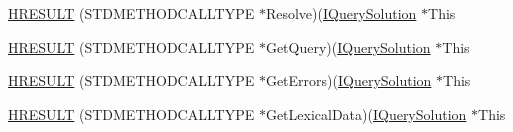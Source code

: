 \begin{DoxyCompactItemize}
\item 
\hyperlink{struct_i_query_solution_vtbl_a285c6d05bfc27f9d668abb84b76f8488}{H\+R\+E\+S\+U\+LT} (S\+T\+D\+M\+E\+T\+H\+O\+D\+C\+A\+L\+L\+T\+Y\+PE $\ast$Resolve)(\hyperlink{structuredquery_8h_a34bdc4e4bd6e4cc32567fef04b30b355}{I\+Query\+Solution} $\ast$This
\item 
\hyperlink{struct_i_query_solution_vtbl_ac13d188c80d86d1204cae8c1918f3496}{H\+R\+E\+S\+U\+LT} (S\+T\+D\+M\+E\+T\+H\+O\+D\+C\+A\+L\+L\+T\+Y\+PE $\ast$Get\+Query)(\hyperlink{structuredquery_8h_a34bdc4e4bd6e4cc32567fef04b30b355}{I\+Query\+Solution} $\ast$This
\item 
\hyperlink{struct_i_query_solution_vtbl_ada01414793b4613481e74e934a9be62f}{H\+R\+E\+S\+U\+LT} (S\+T\+D\+M\+E\+T\+H\+O\+D\+C\+A\+L\+L\+T\+Y\+PE $\ast$Get\+Errors)(\hyperlink{structuredquery_8h_a34bdc4e4bd6e4cc32567fef04b30b355}{I\+Query\+Solution} $\ast$This
\item 
\hyperlink{struct_i_query_solution_vtbl_a8349d868d4bb5b7825d30899277dff33}{H\+R\+E\+S\+U\+LT} (S\+T\+D\+M\+E\+T\+H\+O\+D\+C\+A\+L\+L\+T\+Y\+PE $\ast$Get\+Lexical\+Data)(\hyperlink{structuredquery_8h_a34bdc4e4bd6e4cc32567fef04b30b355}{I\+Query\+Solution} $\ast$This
\end{DoxyCompactItemize}
